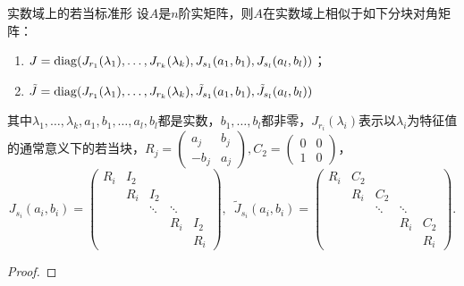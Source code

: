 \begin{theorem}{}{实数域上的若当标准形}
    设$A$是$n$阶实矩阵，则$A$在实数域上相似于如下分块对角矩阵：
    \begin{enumerate}
        \item $J=\operatorname{diag}(J_{r_1}(\lambda_1),\ldots,J_{r_k}(\lambda_k),J_{s_1}(a_1,b_1),J_{s_l}(a_l,b_l))$；
        \item $\tilde{J}=\operatorname{diag}(J_{r_1}(\lambda_1),\ldots,J_{r_k}(\lambda_k),\tilde{J}_{s_1}(a_1,b_1),\tilde{J}_{s_l}(a_l,b_l))$
    \end{enumerate}
    其中$\lambda_1,\ldots,\lambda_k,a_1,b_1,\ldots,a_l,b_l$都是实数，$b_1,\ldots,b_l$都非零，$J_{r_i}(\lambda_i)$表示以$\lambda_i$为特征值的通常意义下的若当块，$R_j=\begin{pmatrix}
            a_j & b_j \\ -b_j & a_j
        \end{pmatrix},C_2=\begin{pmatrix}
            0 & 0 \\ 1 & 0
        \end{pmatrix}$，
    \[J_{s_i}(a_i,b_i)=\begin{pmatrix}
            R_i & I_2 &        &        &     \\
                & R_i & I_2    &        &     \\
                &     & \ddots & \ddots &     \\
                &     &        & R_i    & I_2 \\
                &     &        &        & R_i
        \end{pmatrix},\enspace \tilde{J}_{s_i}(a_i,b_i)=\begin{pmatrix}
            R_i & C_2 &        &        &     \\
                & R_i & C_2    &        &     \\
                &     & \ddots & \ddots &     \\
                &     &        & R_i    & C_2 \\
                &     &        &        & R_i
        \end{pmatrix}.\]
\end{theorem}
\begin{proof}

\end{proof}

\begin{summary}

\end{summary}


